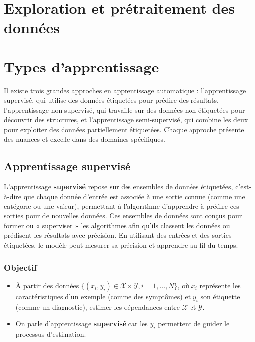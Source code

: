 \documentclass[a4paper,12pt]{report}
\begin{document}
\section{Exploration et prétraitement des données }

    \section{Types d’apprentissage}
    
        Il existe trois grandes approches en apprentissage automatique : l'apprentissage supervisé, qui utilise des données étiquetées pour prédire des résultats, l'apprentissage non supervisé, qui travaille sur des données non étiquetées pour découvrir des structures, et l'apprentissage semi-supervisé, qui combine les deux pour exploiter des données partiellement étiquetées. Chaque approche présente des nuances et excelle dans des domaines spécifiques.
        
        \subsection{Apprentissage supervisé}
        
        L'apprentissage \textbf{supervisé} repose sur des ensembles de données étiquetées, c’est-à-dire que chaque donnée d’entrée est associée à une sortie connue (comme une catégorie ou une valeur), permettant à l’algorithme d’apprendre à prédire ces sorties pour de nouvelles données. Ces ensembles de données sont conçus pour former ou « superviser » les algorithmes afin qu'ils classent les données ou prédisent les résultats avec précision. En utilisant des entrées et des sorties étiquetées, le modèle peut mesurer sa précision et apprendre au fil du temps.
        
        \subsubsection*{Objectif}
        
        \begin{itemize}
            \item  À partir des données \(\{(x_i, y_i) \in \mathcal{X} \times \mathcal{Y}, i = 1, \ldots, N\}\), où \(x_i\) représente les caractéristiques d’un exemple (comme des symptômes) et \(y_i\) son étiquette (comme un diagnostic), estimer les dépendances entre \(\mathcal{X}\) et \(\mathcal{Y}\).
            \item  On parle d'apprentissage \textbf{supervisé} car les \(y_i\) permettent de guider le processus d’estimation.
        \end{itemize}
        
\end{document}
